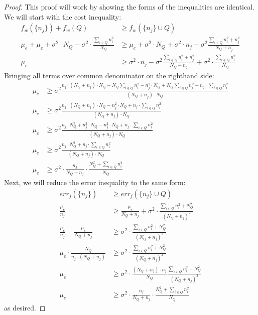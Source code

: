 \documentclass{article}
\newcommand{\cd}[0]{\cdot}
\newcommand{\mue}[0]{\ensuremath{\mu_e}}
\newcommand{\var}[0]{\ensuremath{\sigma^2}}
\newcommand{\ndraw}[0]{\ensuremath{n}}
\newcommand{\total}[0]{\ensuremath{N}}
\newcommand{\costw}[0]{\ensuremath{f_w}}
\begin{document}
\addminsame*
\begin{proof}
This proof will work by showing the forms of the inequalities are identical. We will start with the cost inequality:
\begin{align*}
\costw(\{\ndraw_j\}) + \costw(Q) &\geq \costw(\{\ndraw_j\} \cup Q)  \\
\mue + \mue + \var \cd \total_Q - \var \cd \frac{\sum_{i \in Q}\ndraw_i^2}{\total_Q}&\geq\mue + \var \cd \total_Q + \var \cd \ndraw_j - \var \frac{\sum_{i\in Q}\ndraw_i^2 + \ndraw_j^2}{\total_Q + \ndraw_j}\\
\mue &\geq \var \cd \ndraw_j - \var \frac{\sum_{i\in Q}\ndraw_i^2 + \ndraw_j^2}{\total_Q + \ndraw_j}+ \var \cd \frac{\sum_{i \in Q}\ndraw_i^2}{\total_Q}
\end{align*}
Bringing all terms over common denominator on the righthand side: 
\begin{align*}
\mue &\geq  \var \frac{\ndraw_j \cd (\total_Q + \ndraw_j) \cd \total_Q - \total_Q \sum_{i \in Q}\ndraw_i^2 - \ndraw_j^2 \cd \total_Q + \total_Q \sum_{i \in Q} \ndraw_i^2 + \ndraw_j \cd \sum_{i \in Q}\ndraw_i^2}{(\total_Q + \ndraw_j) \cd \total_Q}\\   
\mue &\geq  \var \frac{\ndraw_j \cd (\total_Q + \ndraw_j) \cd \total_Q - \ndraw_j^2 \cd \total_Q + \ndraw_j \cd \sum_{i \in Q}\ndraw_i^2}{(\total_Q + \ndraw_j) \cd \total_Q}\\
\mue &\geq  \var \frac{\ndraw_j \cd \total_Q^2 + \ndraw_j^2 \cd \total_Q - \ndraw_j^2 \cd \total_Q + \ndraw_j \cd \sum_{i \in Q}\ndraw_i^2}{(\total_Q + \ndraw_j) \cd \total_Q}\\
\mue &\geq  \var \frac{\ndraw_j \cd \total_Q^2 + \ndraw_j \cd \sum_{i \in Q}\ndraw_i^2}{(\total_Q + \ndraw_j) \cd \total_Q}\\
\mue &\geq  \var \cd \frac{\ndraw_j}{\total_Q + \ndraw_j} \cd \frac{\total_Q^2 + \sum_{i \in Q}\ndraw_i^2}{\total_Q}
\end{align*}
Next, we will reduce the error inequality to the same form: 
\begin{align*}
err_j(\{\ndraw_j\}) &\geq err_j(\{\ndraw_j\} \cup Q) \\
\frac{\mue}{\ndraw_j} &\geq  \frac{\mue}{\total_Q + \ndraw_j} + \var \cd \frac{\sum_{i \in Q}\ndraw_i^2 + \total_Q^2}{(\total_Q + \ndraw_j)^2}\\
\frac{\mue}{\ndraw_j} -\frac{\mue}{\total_Q + \ndraw_j}&\geq  \var \cd \frac{\sum_{i \in Q}\ndraw_i^2 + \total_Q^2}{(\total_Q + \ndraw_j)^2}\\
\mue \cd \frac{\total_Q}{\ndraw_j \cd (\total_Q +\ndraw_j)}&\geq  \var \cd \frac{\sum_{i \in Q}\ndraw_i^2 + \total_Q^2}{(\total_Q + \ndraw_j)^2}\\
\mue&\geq  \var \cd \frac{(\total_Q + \ndraw_j) \cd \ndraw_j}{\total_Q} \frac{\sum_{i \in Q}\ndraw_i^2 + \total_Q^2}{(\total_Q + \ndraw_j)^2}\\
\mue &\geq  \var \cd \frac{\ndraw_j}{\total_Q + \ndraw_j} \cd \frac{\total_Q^2 + \sum_{i \in Q}\ndraw_i^2}{\total_Q}
\end{align*}
as desired. 
\end{proof}
\end{document}
